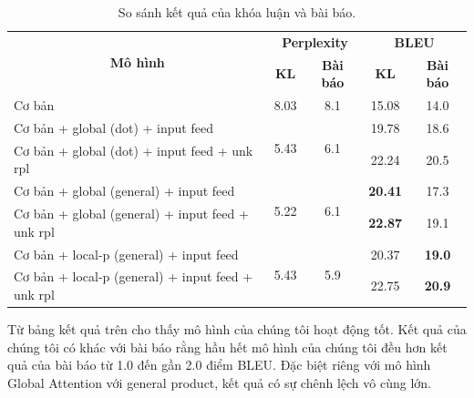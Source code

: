 \begin{table}
	\centering
	\begin{tabular}{|l|c|c|c|c|} 
		\hline
		\multicolumn{1}{|c|}{\multirow{2}{*}{\textbf{Mô hình} }} & \multicolumn{2}{c|}{\textbf{Perplexity }}    & \multicolumn{2}{c|}{\textbf{BLEU }}  \\ 
		\cline{2-5}
		\multicolumn{1}{|c|}{}                                   & \textbf{KL}           & \textbf{Bài báo}     & \textbf{KL}    & \textbf{Bài báo}    \\ 
		\hline
		Cơ bản                                                   & 8.03                  & 8.1                  & 15.08          & 14.0                \\ 
		\hline
		Cơ bản + global (dot) + input feed                       & \multirow{2}{*}{5.43} & \multirow{2}{*}{6.1} & 19.78          & 18.6                \\ 
		\cline{1-1}\cline{4-5}
		Cơ bản + global (dot) + input feed + unk rpl             &                       &                      & 22.24          & 20.5                \\ 
		\hline
		Cơ bản + global (general) + input feed                   & \multirow{2}{*}{5.22} & \multirow{2}{*}{6.1} & \textbf{20.41} & 17.3                \\ 
		\cline{1-1}\cline{4-5}
		Cơ bản + global (general) + input feed + unk rpl         &                       &                      & \textbf{22.87} & 19.1                \\ 
		\hline
		Cơ bản + local-p (general) + input feed                  & \multirow{2}{*}{5.43} & \multirow{2}{*}{5.9} & 20.37          & \textbf{19.0}       \\ 
		\cline{1-1}\cline{4-5}
		Cơ bản + local-p (general) + input feed + unk rpl        &                       &                      & 22.75          & \textbf{20.9}       \\
		\hline
	\end{tabular}
	\caption{So sánh kết quả của khóa luận và bài báo.}
	\label{tab_thesis-paper}
\end{table}

Từ bảng kết quả trên cho thấy mô hình của chúng tôi hoạt động tốt. Kết quả của chúng tôi có khác với bài báo rằng hầu hết mô hình của chúng tôi đều hơn kết quả của bài báo từ 1.0 đến gần 2.0 điểm BLEU. Đặc biệt riêng với mô hình Global Attention với general product, kết quả có sự chênh lệch vô cùng lớn.

